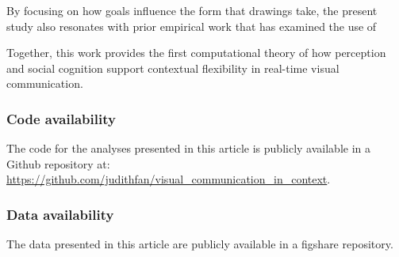 \documentclass[9pt,twocolumn,twoside]{pnas-new}
\begin{document}
By focusing on how goals influence the form that drawings take, the present study also resonates with prior empirical work that has examined the use of 




\cite{Garrod:2007wk}
\cite{fay2010interactive}
\cite{garrod2010can}





Together, this work provides the first computational theory of how perception and social cognition support contextual flexibility in real-time visual communication.

\subsubsection*{Code availability} The code for the analyses presented in this article is publicly available in a Github repository at: \url{https://github.com/judithfan/visual_communication_in_context}.

\subsubsection*{Data availability} The data presented in this article are publicly available in a figshare repository.


\end{document}
